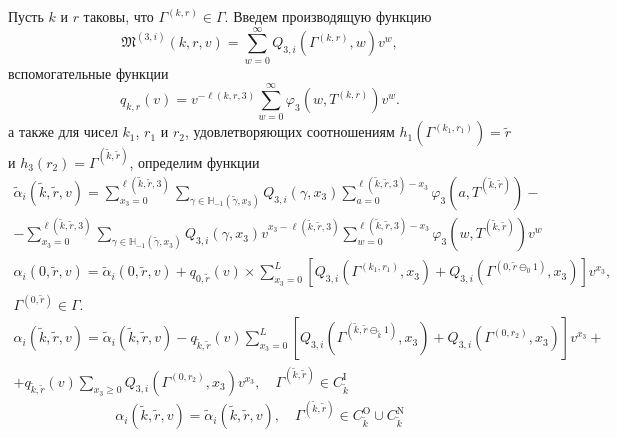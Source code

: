 \documentclass{report}
\begin{document}
Пусть $k$ и $r$ таковы, что $\Gamma^{(k,r)}\in \Gamma$. Введем производящую функцию
\begin{equation*}
\mathfrak{M}^{(3,i)}(k,r,v) = \sum_{w=0}^{\infty} Q_{3,i}(\Gamma^{(k,r)},w) v^w,
\end{equation*}
вспомогательные функции
\begin{equation*}
q_{k,r}(v) = v^{-\ell(k,r,3)}\sum_{w=0}^{\infty} \varphi_3(w,T^{(k,r)})v^w.
\end{equation*}
а также для чисел $k_1$, $r_1$ и $r_2$, удовлетворяющих соотношениям $h_1(\Gamma^{(k_1,r_1)}) = \tilde{r}$ и $h_3(r_2)=\Gamma^{(\tilde{k},\tilde{r})}$, определим функции
\begin{multline}
\tilde{\alpha}_i(\tilde{k},\tilde{r},v) = \sum_{x_3=0}^{\ell(\tilde{k},\tilde{r},3)}\sum_{\gamma \in {\mathbb H}_{-1}(\tilde{\gamma},x_3)} Q_{3,i}(\gamma,x_3) \sum_{a=0}^{\ell(\tilde{k},\tilde{r},3) - x_3} \varphi_3(a,T^{(\tilde{k},\tilde{r})}) - \\
- \sum_{x_3=0}^{\ell(\tilde{k},\tilde{r},3)}  \sum_{\gamma \in {\mathbb H}_{-1}(\tilde{\gamma},x_3)} Q_{3,i}(\gamma,x_3) v^{x_3-\ell(\tilde{k},\tilde{r},3)}  \sum_{w=0}^{\ell(\tilde{k},\tilde{r},3) -x_3}
\varphi_3(w,T^{(\tilde{k},\tilde{r})}) v^w
\end{multline}
\begin{multline}
\alpha_i(0,\tilde{r},v) =\tilde{\alpha}_i(0,\tilde{r},v) + q_{0,\tilde{r}}(v) \times \sum_{x_3=0}^{L} \left[ Q_{3,i}(\Gamma^{(k_1,r_1)},x_3) + Q_{3,i}(\Gamma^{(0,\tilde{r}\ominus_0 1)},x_3) \right] v^{x_3}, \\ \Gamma^{(0,\tilde{r})} \in \Gamma.
\end{multline}
\begin{multline}
\alpha_i(\tilde{k},\tilde{r},v) =\tilde{\alpha}_i(\tilde{k},\tilde{r},v) - q_{\tilde{k},\tilde{r}}(v)\sum_{x_3=0}^{L} \left[ Q_{3,i}(\Gamma^{(\tilde{k},\tilde{r}\ominus_{\tilde{k}} 1)},x_3) + Q_{3,i}(\Gamma^{(0,r_2)},x_3) \right] v^{x_3}+ \\ 
+ q_{\tilde{k},\tilde{r}}(v)  \sum_{x_3\geqslant 0} Q_{3,i}(\Gamma^{(0,r_2)},x_3) v^{x_3}, \quad \Gamma^{(\tilde{k}, \tilde{r})} \in C_{\tilde{k}}^{\mathrm{I}}
\end{multline}
\begin{equation}
\alpha_i(\tilde{k},\tilde{r},v) =\tilde{\alpha}_i(\tilde{k},\tilde{r},v), \quad \Gamma^{(\tilde{k}, \tilde{r})} \in C_{\tilde{k}}^{\mathrm{O}} \cup C_{\tilde{k}}^{\mathrm{N}}
\end{equation}
\end{document}
